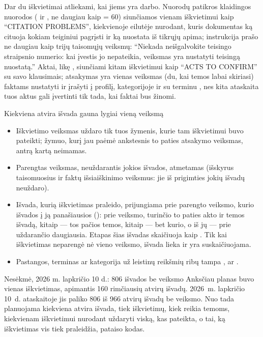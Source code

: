 Dar du iškvietimai atliekami, kai jiems yra darbo. Nuorodų patikros klaidingos nuorodos
( ir , ne daugiau kaip  = 60)
siunčiamos vienam iškvietimui kaip \enquote{CITATION PROBLEMS}, kiekvienoje eilutėje nurodant,
kuris dokumentas ką cituoja kokiam teiginiui pagrįsti ir ką nuostata iš tikrųjų apima;
instrukcija prašo ne daugiau kaip trijų taisomųjų veiksmų: \enquote{Niekada neišgalvokite
teisingo straipsnio numerio: kai įvestis jo nepateikia, veiksmas yra nustatyti teisingą
nuostatą.} Aktai, likę , siunčiami kitam iškvietimui kaip \enquote{ACTS TO
CONFIRM} su savo klausimais; atsakymas yra vienas veiksmas (du, kai temos labai skiriasi)
faktams nustatyti ir įrašyti į profilį, kategorijoje  ir su terminu
, nes kita ataskaita tuos aktus gali įvertinti tik tada, kai faktai bus žinomi.

\begin{codebox}{Kiekviena atvira išvada gauna lygiai vieną veiksmą}
\begin{itemize}
  \item Iškvietimo veiksmas uždaro tik tuos žymenis, kurie tam iškvietimui buvo pateikti;
    žymuo, kurį jau paėmė ankstesnis to paties atsakymo veiksmas, antrą kartą neimamas.
  \item Parengtas veiksmas, neuždarantis jokios išvados, atmetamas (išskyrus taisomuosius ir
    faktų išsiaiškinimo veiksmus: jie iš prigimties jokių išvadų neuždaro).
  \item Išvada, kurią iškvietimas praleido, prijungiama prie parengto veiksmo, kurio išvados į
    ją panašiausios (): prie veiksmo, turinčio to paties akto ir temos
    išvadą, kitaip --- tos pačios temos, kitaip --- bet kurio, o iš jų --- prie uždarančio
    daugiausia. Etapas šias išvadas skaičiuoja kaip . Tik kai iškvietimas
    neparengė nė vieno veiksmo, išvada lieka  ir yra suskaičiuojama.
  \item Pastangos, terminas ar kategorija už leistinų reikšmių ribų tampa ,
     ar .
\end{itemize}
\end{codebox}

\begin{lessonbox}{Nesėkmė, 2026 m. lapkričio 10 d.: 806 išvados be veiksmo}
Anksčiau planas buvo vienas iškvietimas, apimantis 160 rimčiausių atvirų išvadų. 2026~m. lapkričio 10~d.
ataskaitoje jis paliko 806 iš 966 atvirų išvadų be veiksmo. Nuo tada planuojama kiekviena
atvira išvada, tiek iškvietimų, kiek reikia temoms, kiekvienam iškvietimui nurodant uždaryti
viską, kas pateikta, o tai, ką iškvietimas vis tiek praleidžia, pataiso kodas.
\end{lessonbox}

